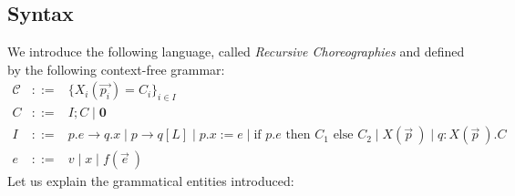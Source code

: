 \documentclass[12pt,a4paper,twoside]{book}
\begin{document}
\subsection{Syntax}
We introduce the following language, called \textit{Recursive Choreographies} and defined by the following context-free grammar:
$$
\begin{array}{rcl}
\mathscr{C} & ::= & \{X_i(\vec{p_i}) = C_i\}_{i \in I} \\
C & ::= & I; C \mid \boldsymbol{0} \\
I & ::= & p.e \rightarrow q.x \mid p \rightarrow q[L] \mid p.x := e \mid \text{if } p.e \text{ then } C_1 \text{ else } C_2 \mid X(\vec{p}~) \mid q : X(\vec{p}~).C\\
e & ::= & v \mid x \mid f(\vec{e}~)
\end{array}
$$
Let us explain the grammatical entities introduced:
\end{document}
